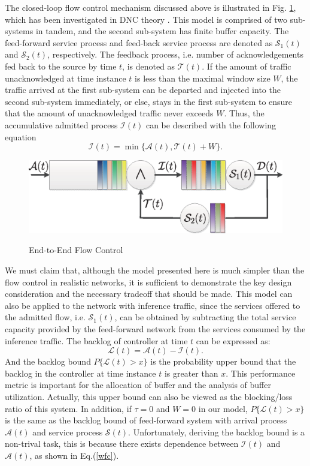 \documentclass[paper]{ieice}
\begin{document}
The closed-loop flow control mechanism discussed above is illustrated in Fig. \ref{control1}, which has been investigated in DNC theory \cite{CrOk96,AgRa96,Chan98,ACOR99,QLDD09FC,bose2006analysis,Qian2010Analysis}. This model is comprised of two sub-systems in tandem, and the second sub-system has finite buffer capacity. The feed-forward service process and feed-back service process are denoted as $\mathcal{S}_1(t)$ and $\mathcal{S}_2(t)$, respectively. The feedback process, i.e. number of acknowledgements fed back to the source by time $t$, is denoted as $\mathcal{T}(t)$. If the amount of traffic unacknowledged at time instance $t$ is less than the maximal window size $W$, the traffic arrived at the first sub-system can be departed and injected into the second sub-system immediately, or else, stays in the first sub-system to ensure that the amount of unacknowledged traffic never exceeds $W$. Thus, the accumulative admitted process $\mathcal{I}(t)$ can be described with the following equation
\begin{equation}\label{wfc}
\mathcal{I}(t)=\min\{\mathcal{A}(t),\mathcal{T}(t)+W\}.
\end{equation}
\begin{figure}[ht]
  \centering\includegraphics[scale=0.45]{figures/QueueModel1.eps}\\
  \caption{End-to-End Flow Control}\label{control1}
\end{figure}

We must claim that, although the model presented here is much simpler than the flow control in realistic networks, it is sufficient to demonstrate the key design consideration and the necessary tradeoff that should be made. This model can also be applied to the network with inference traffic, since the services offered to the admitted flow, i.e. $\mathcal{S}_1(t)$, can be obtained by subtracting the total service capacity provided by the feed-forward network from the services consumed by the inference traffic. The backlog of controller at time $t$ can be expressed as:
$$\mathcal{L}(t)=\mathcal{A}(t)-\mathcal{I}(t).$$
And the backlog bound $P\{\mathcal{L}(t)>x\}$ is the probability upper bound that the backlog in the controller at time instance $t$ is greater than $x$. This performance metric is important for the allocation of buffer and the analysis of buffer utilization. Actually, this upper bound can also be viewed as the blocking/loss ratio of this system. In addition, if $\tau=0$ and $W=0$ in our model, $P\{\mathcal{L}(t)>x\}$ is the same as the backlog bound of feed-forward system with arrival process $\mathcal{A}(t)$ and service process $\mathcal{S}(t)$. Unfortunately, deriving the backlog bound is a non-trival task, this is because there exists dependence between $\mathcal{I}(t)$ and $\mathcal{A}(t)$, as shown in Eq.(\ref{wfc}).
\end{document}
